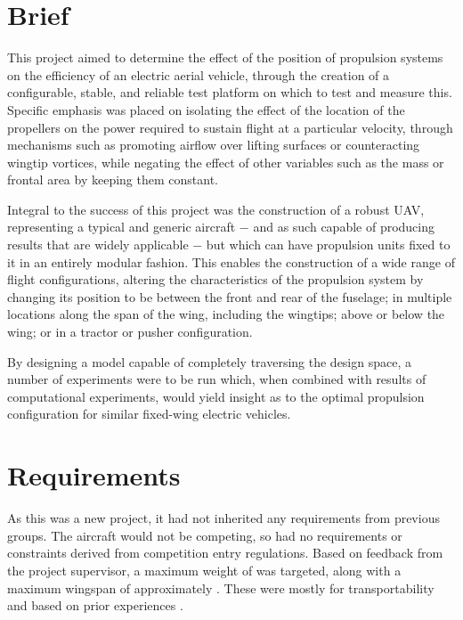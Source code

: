 \documentclass[../../main.tex]{subfiles}
\begin{document}


\section{Brief} \label{sec:design-specification:brief}

This project aimed to determine the effect of the position of propulsion systems on the efficiency of an electric aerial vehicle, through the creation of a configurable, stable, and reliable test platform on which to test and measure this.
Specific emphasis was placed on isolating the effect of the location of the propellers on the power required to sustain flight at a particular velocity, through mechanisms such as promoting airflow over lifting surfaces or counteracting wingtip vortices, while negating the effect of other variables such as the mass or frontal area by keeping them constant. 

Integral to the success of this project was the construction of a robust UAV, representing a typical and generic aircraft $-$ and as such capable of producing results that are widely applicable $-$ but which can have propulsion units fixed to it in an entirely modular fashion.
This enables the construction of a wide range of flight configurations, altering the characteristics of the propulsion system by changing its position to be between the front and rear of the fuselage; in multiple locations along the span of the wing, including the wingtips; above or below the wing; or in a tractor or pusher configuration. 

By designing a model capable of completely traversing the design space, a number of experiments were to be run which, when combined with results of computational experiments, would yield insight as to the optimal propulsion configuration for similar fixed-wing electric vehicles. 

\section{Requirements} \label{sec:design-specification:requirements}

As this was a new project, it had not inherited any requirements from previous groups. 
The aircraft would not be competing, so had no requirements or constraints derived from competition entry regulations. 
Based on feedback from the project supervisor, a maximum weight of  was targeted, along with a maximum wingspan of approximately .
These were mostly for transportability and based on prior experiences \cite{towell-19}.  %
\end{document}
